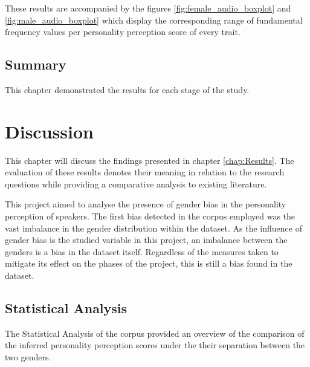 \documentclass{l4proj}
\begin{document}
These results are accompanied by the figures \ref{fig:female_audio_boxplot} and \ref{fig:male_audio_boxplot} which display the corresponding range of fundamental frequency values per personality perception score of every trait.

\section{Summary}
This chapter demonstrated the results for each stage of the study.
\chapter{Discussion}\label{chap:discussion}
This chapter will discuss the findings presented in chapter \ref{chap:Results}. The evaluation of these results denotes their meaning in relation to the research questions while providing a comparative analysis to existing literature.


This project aimed to analyse the presence of gender bias in the personality perception of speakers. 
The first bias detected in the corpus employed was the vast imbalance in the gender distribution within the dataset. As the influence of gender bias is the studied variable in this project, an imbalance between the genders is a bias in the dataset itself. Regardless of the measures taken to mitigate its effect on the phases of the project, this is still a bias found in the dataset.

\section{Statistical Analysis}
The Statistical Analysis of the corpus provided an overview of the comparison of the inferred personality perception scores under the their separation between the two genders.
\end{document}
